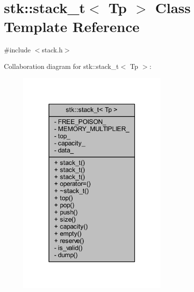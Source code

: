 \hypertarget{classstk_1_1stack__t}{}\section{stk\+:\+:stack\+\_\+t$<$ Tp $>$ Class Template Reference}
\label{classstk_1_1stack__t}


{\ttfamily \#include $<$stack.\+h$>$}



Collaboration diagram for stk\+:\+:stack\+\_\+t$<$ Tp $>$\+:
\nopagebreak
\begin{figure}[H]
\begin{center}
\leavevmode
\includegraphics[width=213pt]{classstk_1_1stack__t__coll__graph}
\end{center}
\end{figure}
